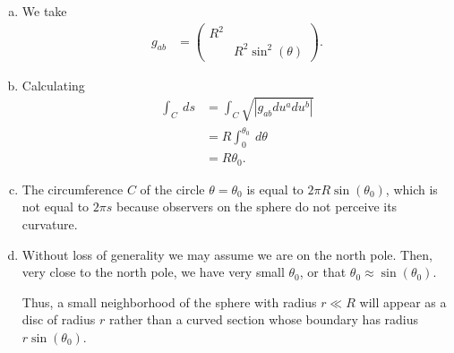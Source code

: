 \documentclass[10pt]{mypackage}
\begin{document}
\begin{solution}[30.21]\hfill
  \begin{enumerate}[(a)]
    \item We take
      \begin{align*}
        g_{ab} &= \begin{pmatrix}R^2 & \\ & R^2\sin^2\left( \theta \right)\end{pmatrix}.
      \end{align*}
    \item Calculating
      \begin{align*}
        \int_{C}^{} \:ds &= \int_{C}^{}\sqrt{\left\vert g_{ab}du^{a}du^{b} \right\vert}\\
                         &= R\int_{0}^{\theta_0} \:d\theta\\
                         &= R\theta_{0}.
      \end{align*}
    \item The circumference $C$ of the circle $\theta = \theta_0$ is equal to $2\pi R \sin\left( \theta_0 \right)$, which is not equal to $2\pi s$ because observers on the sphere do not perceive its curvature.
    \item Without loss of generality we may assume we are on the north pole. Then, very close to the north pole, we have very small $\theta_0$, or that $\theta_0\approx \sin\left( \theta_0 \right)$.\newline

      Thus, a small neighborhood of the sphere with radius $r \ll R$ will appear as a disc of radius $r$ rather than a curved section whose boundary has radius $r\sin\left( \theta_0 \right)$.
  \end{enumerate}
\end{solution}
\begin{solution}[30.22]

\end{solution}
\begin{solution}[30.28]

\end{solution}
\end{document}
